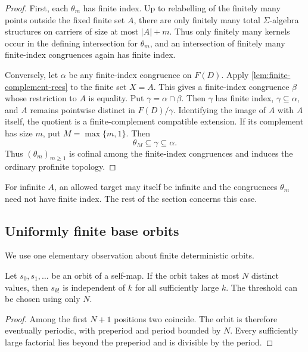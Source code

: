 \begin{proof}
First, each $\theta_m$ has finite index.  Up to relabelling of the finitely many
points outside the fixed finite set $A$, there are only finitely many total
$\Sigma$-algebra structures on carriers of size at most $|A|+m$.  Thus only
finitely many kernels occur in the defining intersection for $\theta_m$, and
an intersection of finitely many finite-index congruences again has finite
index.

Conversely, let $\alpha$ be any finite-index congruence on $F(D)$.  Apply
\cref{lem:finite-complement-rees} to the finite set $X=A$.  This gives a
finite-index congruence $\beta$ whose restriction to $A$ is equality.  Put
$\gamma=\alpha\cap\beta$.  Then $\gamma$ has finite index,
$\gamma\subseteq\alpha$, and $A$ remains pointwise distinct in
$F(D)/\gamma$.  Identifying the image of $A$ with $A$ itself, the quotient is a
finite-complement compatible extension.  If its complement has size $m$, put
$M=\max\{m,1\}$.  Then
\[
 \theta_M\subseteq\gamma\subseteq\alpha.
\]
Thus $(\theta_m)_{m\ge1}$ is cofinal among the finite-index congruences and
induces the ordinary profinite topology.
\end{proof}

For infinite $A$, an allowed target may itself be infinite and the congruences
$\theta_m$ need not have finite index.  The rest of the section concerns this
case.

\subsection{Uniformly finite base orbits}

We use one elementary observation about finite deterministic orbits.

\begin{lemma}\label{lem:finite-orbit-factorials}
Let $s_0,s_1,\ldots$ be an orbit of a self-map.  If the orbit takes at most
$N$ distinct values, then $s_{k!}$ is independent of $k$ for all sufficiently
large $k$.  The threshold can be chosen using only $N$.
\end{lemma}

\begin{proof}
Among the first $N+1$ positions two coincide.  The orbit is therefore eventually
periodic, with preperiod and period bounded by $N$.  Every sufficiently large
factorial lies beyond the preperiod and is divisible by the period.
\end{proof}

